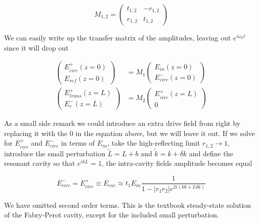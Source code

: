 \begin{equation}
M_{1,2} = 
\begin{pmatrix}
t_{1,2} & -r_{1,2} \\
r_{1,2} & t_{1,2}
\end{pmatrix}
\end{equation}

We can easily write up the transfer matrix of the amplitudes, leaving out $e^{i\omega_0 t}$ since it will drop out

\begin{subequations}
\begin{align}
\begin{pmatrix}
E_{circ}^{+}(z = 0) \\
E_{ref}(z = 0)
\end{pmatrix}
 & = M_{1}
\begin{pmatrix}
E_{in}(z = 0) \\
E_{circ}^{-}(z = 0)
\end{pmatrix} \\
\begin{pmatrix}
E_{trans}^{+}(z = L) \\
E_{c}^{-}(z = L)
\end{pmatrix}
 & = M_{2}
\begin{pmatrix}
E_{circ}^{+}(z = L) \\
0
\end{pmatrix}
\end{align}
\end{subequations}

As a small side remark we could introduce an extra drive field from right by replacing it with the 0 in the equation above, but we will leave it out. If we solve for $E_{circ}^{+}$ and $E_{circ}^{-}$ in terms of $E_{in}$, take the high-reflecting limit $r_{1,2} \rightarrow 1$, introduce the small perturbation $\tilde{L} = L + b$ and $\tilde{k} = k + \delta k$ and define the resonant cavity so that $e^{ikL} = 1$, the intra-cavity fields amplitude becomes equal

\begin{equation}
E_{circ}^{-} = E_{circ}^{+} \equiv E_{cav} \approx t_1 E_{in} \frac{1}{1 - \left|r_1r_2\right|e^{2i(kb + L\delta k)}}
\end{equation}

We have omitted second order terms. This is the textbook steady-state solution of the Fabry-Perot cavity, except for the included small perturbation.